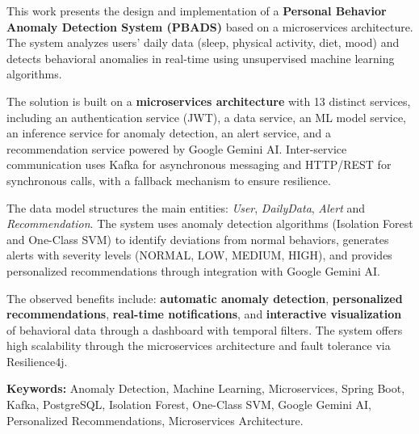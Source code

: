 This work presents the design and implementation of a \textbf{Personal Behavior Anomaly Detection System (PBADS)} based on a microservices architecture. The system analyzes users' daily data (sleep, physical activity, diet, mood) and detects behavioral anomalies in real-time using unsupervised machine learning algorithms.

The solution is built on a \textbf{microservices architecture} with 13 distinct services, including an authentication service (JWT), a data service, an ML model service, an inference service for anomaly detection, an alert service, and a recommendation service powered by Google Gemini AI. Inter-service communication uses Kafka for asynchronous messaging and HTTP/REST for synchronous calls, with a fallback mechanism to ensure resilience.

The data model structures the main entities: \textit{User}, \textit{DailyData}, \textit{Alert} and \textit{Recommendation}. The system uses anomaly detection algorithms (Isolation Forest and One-Class SVM) to identify deviations from normal behaviors, generates alerts with severity levels (NORMAL, LOW, MEDIUM, HIGH), and provides personalized recommendations through integration with Google Gemini AI.

The observed benefits include: \textbf{automatic anomaly detection}, \textbf{personalized recommendations}, \textbf{real-time notifications}, and \textbf{interactive visualization} of behavioral data through a dashboard with temporal filters. The system offers high scalability through the microservices architecture and fault tolerance via Resilience4j.

\textbf{Keywords:} Anomaly Detection, Machine Learning, Microservices, Spring Boot, Kafka, PostgreSQL, Isolation Forest, One-Class SVM, Google Gemini AI, Personalized Recommendations, Microservices Architecture.
